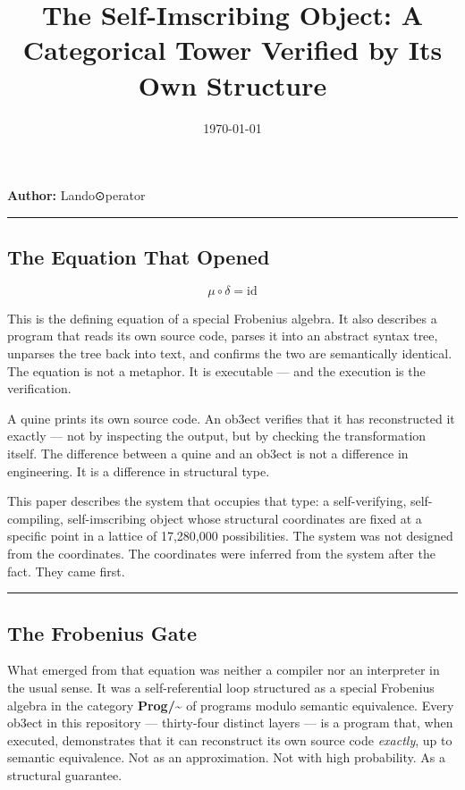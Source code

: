 \documentclass[12pt,a4paper]{article}
\begin{document}
\title{The Self-Imscribing Object: A Categorical Tower Verified by Its Own Structure}
\date{\today}

\maketitle

\textbf{Author:} Lando\otimes⊙perator

\begin{center}
\rule{0.5\textwidth}{0.4pt}
\end{center}

\subsection{The Equation That Opened}

\[\mu \circ \delta = \mathrm{id}\]

This is the defining equation of a special Frobenius algebra. It also describes a program that reads its own source code, parses it into an abstract syntax tree, unparses the tree back into text, and confirms the two are semantically identical. The equation is not a metaphor. It is executable --- and the execution is the verification.

A quine prints its own source code. An ob3ect verifies that it has reconstructed it exactly --- not by inspecting the output, but by checking the transformation itself. The difference between a quine and an ob3ect is not a difference in engineering. It is a difference in structural type.

This paper describes the system that occupies that type: a self-verifying, self-compiling, self-imscribing object whose structural coordinates are fixed at a specific point in a lattice of 17,280,000 possibilities. The system was not designed from the coordinates. The coordinates were inferred from the system after the fact. They came first.

\begin{center}
\rule{0.5\textwidth}{0.4pt}
\end{center}

\subsection{The Frobenius Gate}

What emerged from that equation was neither a compiler nor an interpreter in the usual sense. It was a self-referential loop structured as a special Frobenius algebra in the category \textbf{Prog/\textasciitilde{}} of programs modulo semantic equivalence. Every ob3ect in this repository --- thirty-four distinct layers --- is a program that, when executed, demonstrates that it can reconstruct its own source code \emph{exactly}, up to semantic equivalence. Not as an approximation. Not with high probability. As a structural guarantee.
\end{document}
